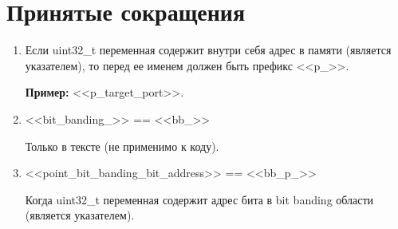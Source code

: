 \section{Принятые сокращения}\label{sk:0}
\begin{enumerate}
	\item Если uint32\_t переменная содержит внутри себя адрес в памяти (является указателем), то перед ее именем должен быть префикс <<p\_>>.
	
	\textbf{Пример:} <<p\_target\_port>>.
	\item <<bit\_banding\_>> == <<bb\_>>
	
	Только в тексте (не применимо к коду).
	\item <<point\_bit\_banding\_bit\_address>> == <<bb\_p\_>>
	
	Когда uint32\_t переменная содержит адрес бита в bit banding области (является указателем).
\end{enumerate}